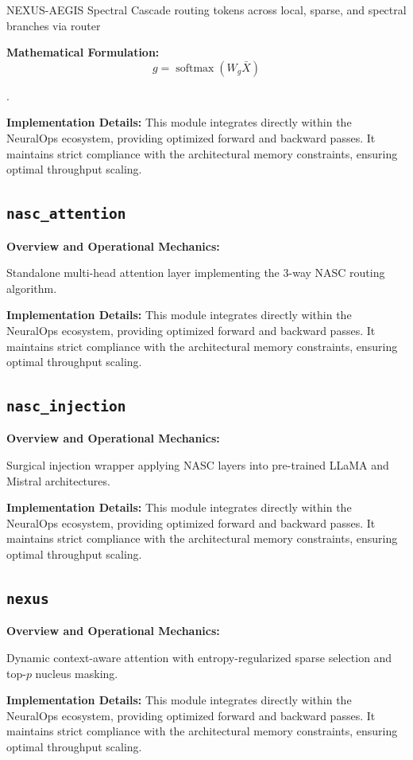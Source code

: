 \documentclass[10pt,twocolumn,letterpaper]{article}
\begin{document}
NEXUS-AEGIS Spectral Cascade routing tokens across local, sparse, and spectral branches via router

\textbf{Mathematical Formulation:}
\begin{equation}
g = \operatorname{softmax}(W_g \bar{X})
\end{equation}

.

\textbf{Implementation Details:}
This module integrates directly within the NeuralOps ecosystem, providing optimized forward and backward passes. It maintains strict compliance with the architectural memory constraints, ensuring optimal throughput scaling.

\subsection{\texttt{nasc\_attention}}
\textbf{Overview and Operational Mechanics:}

Standalone multi-head attention layer implementing the 3-way NASC routing algorithm.

\textbf{Implementation Details:}
This module integrates directly within the NeuralOps ecosystem, providing optimized forward and backward passes. It maintains strict compliance with the architectural memory constraints, ensuring optimal throughput scaling.

\subsection{\texttt{nasc\_injection}}
\textbf{Overview and Operational Mechanics:}

Surgical injection wrapper applying NASC layers into pre-trained LLaMA and Mistral architectures.

\textbf{Implementation Details:}
This module integrates directly within the NeuralOps ecosystem, providing optimized forward and backward passes. It maintains strict compliance with the architectural memory constraints, ensuring optimal throughput scaling.

\subsection{\texttt{nexus}}
\textbf{Overview and Operational Mechanics:}

Dynamic context-aware attention with entropy-regularized sparse selection and top-$p$ nucleus masking.

\textbf{Implementation Details:}
This module integrates directly within the NeuralOps ecosystem, providing optimized forward and backward passes. It maintains strict compliance with the architectural memory constraints, ensuring optimal throughput scaling.
\end{document}
